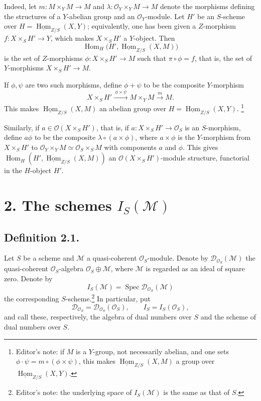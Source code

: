 Indeed, let \(m:M\times_YM\to M\) and
\(\lambda:\mathcal O_Y\times_YM\to M\) denote the morphisms defining
the structures of a \(Y\)-abelian group and an \(\mathcal O_Y\)-module.
Let \(H'\) be an \(S\)-scheme over
\(H=\underline{\operatorname{Hom}}_{Z/S}(X,Y)\); equivalently, one has
been given a \(Z\)-morphism \(f:X\times_SH'\to Y\), which makes
\(X\times_SH'\) a \(Y\)-object. Then
\[
  \operatorname{Hom}_H
    \bigl(H',\underline{\operatorname{Hom}}_{Z/S}(X,M)\bigr)
\]
is the set of \(Z\)-morphisms \(\phi:X\times_SH'\to M\) such that
\(\pi\circ\phi=f\), that is, the set of \(Y\)-morphisms
\(X\times_SH'\to M\).

If \(\phi,\psi\) are two such morphisms, define \(\phi+\psi\) to be the
composite \(Y\)-morphism
\[
  X\times_SH'\xrightarrow{\ \phi\times\psi\ }
  M\times_YM\xrightarrow{\ m\ }M.
\]
This makes \(\underline{\operatorname{Hom}}_{Z/S}(X,M)\) an abelian group
over \(H=\underline{\operatorname{Hom}}_{Z/S}(X,Y)\).
\footnote{Editor's note: if \(M\) is a \(Y\)-group, not necessarily
abelian, and one sets \(\phi\cdot\psi=m\circ(\phi\times\psi)\), this makes
\(\underline{\operatorname{Hom}}_{Z/S}(X,M)\) a group over
\(\underline{\operatorname{Hom}}_{Z/S}(X,Y)\).}

Similarly, if \(a\in\mathcal O(X\times_SH')\), that is, if
\(a:X\times_SH'\to\mathcal O_S\) is an \(S\)-morphism, define
\(a\phi\) to be the composite \(\lambda\circ(a\times\phi)\), where
\(a\times\phi\) is the \(Y\)-morphism from \(X\times_SH'\) to
\(\mathcal O_Y\times_YM\simeq\mathcal O_S\times_SM\) with components
\(a\) and \(\phi\). This gives
\(\operatorname{Hom}_H(H',\underline{\operatorname{Hom}}_{Z/S}(X,M))\)
an \(\mathcal O(X\times_SH')\)-module structure, functorial in the
\(H\)-object \(H'\).

\section*{2. The schemes \(I_S(\mathcal M)\)}

\subsection*{Definition 2.1.}
Let \(S\) be a scheme and \(\mathcal M\) a quasi-coherent
\(\mathcal O_S\)-module. Denote by
\(\mathscr D_{\mathcal O_S}(\mathcal M)\) the quasi-coherent
\(\mathcal O_S\)-algebra \(\mathcal O_S\oplus\mathcal M\), where
\(\mathcal M\) is regarded as an ideal of square zero. Denote by
\[
  I_S(\mathcal M)=\operatorname{Spec}
    \mathscr D_{\mathcal O_S}(\mathcal M)
\]
the corresponding \(S\)-scheme.\footnote{Editor's note: the underlying
space of \(I_S(\mathcal M)\) is the same as that of \(S\).}
In particular, put
\[
  \mathscr D_{\mathcal O_S}
  =\mathscr D_{\mathcal O_S}(\mathcal O_S),
  \qquad I_S=I_S(\mathcal O_S),
\]
and call these, respectively, the algebra of dual numbers over \(S\) and
the scheme of dual numbers over \(S\).

